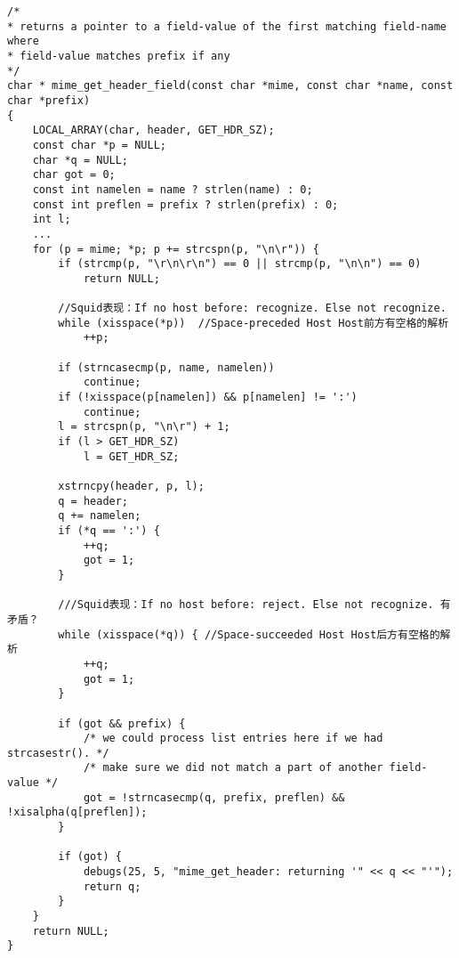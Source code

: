 \begin{lstlisting}[title=squid/src/mime\_header.cc  line:22]
/*
* returns a pointer to a field-value of the first matching field-name where
* field-value matches prefix if any
*/
char * mime_get_header_field(const char *mime, const char *name, const char *prefix)
{
	LOCAL_ARRAY(char, header, GET_HDR_SZ);
	const char *p = NULL;
	char *q = NULL;
	char got = 0;
	const int namelen = name ? strlen(name) : 0;
	const int preflen = prefix ? strlen(prefix) : 0;
	int l;
	...
	for (p = mime; *p; p += strcspn(p, "\n\r")) {
		if (strcmp(p, "\r\n\r\n") == 0 || strcmp(p, "\n\n") == 0)
			return NULL;

		//Squid表现：If no host before: recognize. Else not recognize.
		while (xisspace(*p))  //Space-preceded Host Host前方有空格的解析 
			++p;

		if (strncasecmp(p, name, namelen))
			continue;
		if (!xisspace(p[namelen]) && p[namelen] != ':')
			continue;
		l = strcspn(p, "\n\r") + 1;
		if (l > GET_HDR_SZ)
			l = GET_HDR_SZ;

		xstrncpy(header, p, l);
		q = header;
		q += namelen;
		if (*q == ':') {
			++q;
			got = 1;
		}

		///Squid表现：If no host before: reject. Else not recognize. 有矛盾？
		while (xisspace(*q)) { //Space-succeeded Host Host后方有空格的解析 
			++q;
			got = 1;
		}

		if (got && prefix) {
			/* we could process list entries here if we had strcasestr(). */
			/* make sure we did not match a part of another field-value */
			got = !strncasecmp(q, prefix, preflen) && !xisalpha(q[preflen]);
		}

		if (got) {
			debugs(25, 5, "mime_get_header: returning '" << q << "'");
			return q;
		}
	}
	return NULL;
}
\end{lstlisting}

